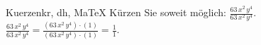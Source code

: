 \begin{MAufgabe}{Kuerzen}{kr, dh, MaTeX}
K\"urzen Sie soweit m\"oglich: $\frac{63\, x^2\, y^4}{63\, x^2\, y^4}$.\\ 
\ifLsg\MLoesung
\quad $\frac{63\, x^2\, y^4}{63\, x^2\, y^4}=\frac{(63\, x^2\, y^4)\cdot(1)}{(63\, x^2\, y^4)\cdot(1)}=\frac{1}{1}$.\else\relax\fi
 \end{MAufgabe}